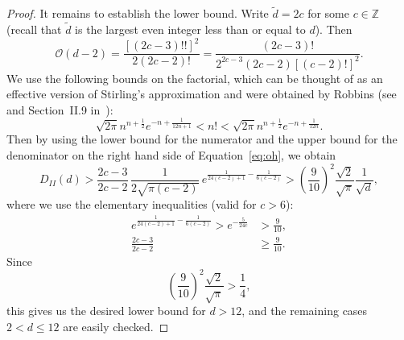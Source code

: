 \documentclass{book}
\newcommand{\ZZ}{\mathbb{Z}}
\begin{document}
\begin{proof}
  It remains to establish the lower bound.  Write $\tilde{d}=2c$ for some
  $c\in\ZZ$ (recall that $\tilde{d}$ is the largest even integer less than or
  equal to $d$).
  Then
  \begin{equation}\label{eq:oh}
    \mathscr{O}(d-2)=\frac{[(2c-3)!!]^2}{2(2c-2)!}=\frac{(2c-3)!}{2^{2c-3}(2c-2)[(c-2)!]^2}.
  \end{equation}
  We use the following bounds on the factorial, which can be thought of as an
  effective version of Stirling's approximation and were obtained by Robbins
  (see~\cite{Robbins} and Section~II.9 in~\cite{Feller}):
  \begin{equation*}
    \sqrt{2\pi}n^{n+\frac{1}{2}}e^{-n+\frac{1}{12n+1}}<n!<\sqrt{2\pi}n^{n+\frac{1}{2}}e^{-n+\frac{1}{12n}}.
  \end{equation*}
  Then by using the lower bound for the numerator and the upper bound for the
  denominator on the right hand side of Equation~\eqref{eq:oh},
  we obtain
  \begin{equation*}
    D_{II}(d)>\frac{2c-3}{2c-2}\,\frac{1}{2\sqrt{\pi(c-2)}}\,
    e^{\frac{1}{24(c-2)+1}-\frac{1}{6(c-2)}}
    >\left(\frac{9}{10}\right)^2\frac{\sqrt{2}}{\sqrt{\pi}}\frac{1}{\sqrt{d}},
  \end{equation*}
  where we use the elementary inequalities (valid for $c>6$):
  \begin{align*}
    e^{\frac{1}{24(c-2)+1}-\frac{1}{6(c-2)}}>e^{-\frac{5}{24c}}&>\frac{9}{10},\\
    \frac{2c-3}{2c-2}&\geq \frac{9}{10}.
  \end{align*}
  Since
  \begin{equation*}
    \left(\frac{9}{10}\right)^2\frac{\sqrt{2}}{\sqrt{\pi}}>\frac{1}{4},
  \end{equation*} 
  this gives us the desired lower bound for $d>12$, and the remaining
  cases $2<d\leq 12$ are easily checked.
\end{proof}
\end{document}

